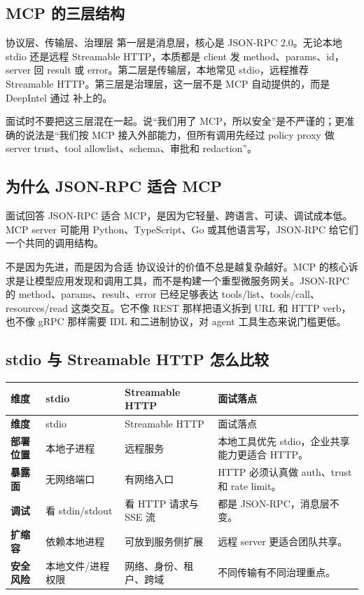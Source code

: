 \subsection{MCP 的三层结构}
\begin{analysisBox}{协议层、传输层、治理层}
第一层是消息层，核心是 JSON-RPC 2.0。无论本地 stdio 还是远程 Streamable HTTP，本质都是 client 发 method、params、id，server 回 result 或 error。第二层是传输层，本地常见 stdio，远程推荐 Streamable HTTP。第三层是治理层，这一层不是 MCP 自动提供的，而是 DeepIntel 通过  补上的。

面试时不要把这三层混在一起。说“我们用了 MCP，所以安全”是不严谨的；更准确的说法是“我们按 MCP 接入外部能力，但所有调用先经过 policy proxy 做 server trust、tool allowlist、schema、审批和 redaction”。
\end{analysisBox}

\subsection{为什么 JSON-RPC 适合 MCP}
\begin{qaBox}{面试回答}
JSON-RPC 适合 MCP，是因为它轻量、跨语言、可读、调试成本低。MCP server 可能用 Python、TypeScript、Go 或其他语言写，JSON-RPC 给它们一个共同的调用结构。
\end{qaBox}

\begin{analysisBox}{不是因为先进，而是因为合适}
协议设计的价值不总是越复杂越好。MCP 的核心诉求是让模型应用发现和调用工具，而不是构建一个重型微服务网关。JSON-RPC 的 method、params、result、error 已经足够表达 tools/list、tools/call、resources/read 这类交互。它不像 REST 那样把语义拆到 URL 和 HTTP verb，也不像 gRPC 那样需要 IDL 和二进制协议，对 agent 工具生态来说门槛更低。
\end{analysisBox}

\subsection{stdio 与 Streamable HTTP 怎么比较}
\begin{longtable}{>{\bfseries}p{}p{}p{}p{}}
\toprule
维度 & stdio & Streamable HTTP & 面试落点 \\
\midrule
\endfirsthead
\toprule
维度 & stdio & Streamable HTTP & 面试落点 \\
\midrule
\endhead
部署位置 & 本地子进程 & 远程服务 & 本地工具优先 stdio，企业共享能力更适合 HTTP。 \\
暴露面 & 无网络端口 & 有网络入口 & HTTP 必须认真做 auth、trust 和 rate limit。 \\
调试 & 看 stdin/stdout & 看 HTTP 请求与 SSE 流 & 都是 JSON-RPC，消息层不变。 \\
扩缩容 & 依赖本地进程 & 可放到服务侧扩展 & 远程 server 更适合团队共享。 \\
安全风险 & 本地文件/进程权限 & 网络、身份、租户、跨域 & 不同传输有不同治理重点。 \\
\bottomrule
\end{longtable}

